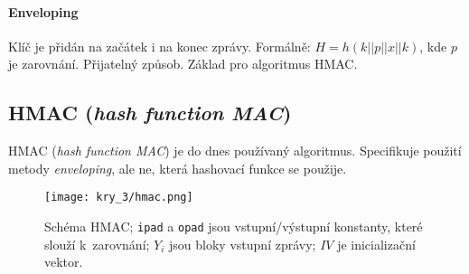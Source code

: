 \paragraph*{Enveloping} Klíč je přidán na začátek i na konec zprávy. Formálně: $H = h(k || p || x || k)$, kde $p$ je zarovnání. Přijatelný způsob. Základ pro algoritmus HMAC.

\subsection{HMAC (\textit{hash function MAC})}

HMAC (\textit{hash function MAC}) je do dnes používaný algoritmus. Specifikuje použití metody \textit{enveloping}, ale ne, která hashovací funkce se použije.

\begin{figure}[H]
    \centering
    \texttt{[image: kry\_3/hmac.png]}
    \caption{Schéma HMAC; \texttt{ipad} a \texttt{opad} jsou vstupní/výstupní konstanty, které slouží k~zarovnání; $Y_i$ jsou bloky vstupní zprávy; $IV$ je inicializační vektor.}
\end{figure}
